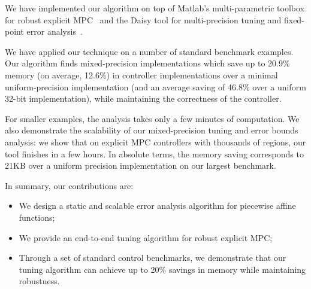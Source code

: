 We have implemented our algorithm on top of Matlab's multi-parametric toolbox 
for robust explicit MPC~\cite{matlabMPT}
and the Daisy tool for multi-precision tuning and fixed-point error analysis~\cite{Daisy}.

We have applied our technique on a number of standard benchmark examples.
Our algorithm finds mixed-precision implementations which save up to 20.9\%
memory (on average, 12.6\%) in controller implementations over a minimal
uniform-precision implementation (and an average saving of 46.8\% over a uniform
32-bit implementation), while maintaining the correctness of the controller.

For smaller examples, the analysis takes only a few minutes of computation.
We also demonstrate the scalability of our mixed-precision tuning and error bounds analysis:
we show that on explicit MPC controllers with thousands of regions, our tool finishes in a few hours.
In absolute terms, the memory saving corresponds to 21KB over a uniform
precision implementation on our largest benchmark.

In summary, our contributions are:
\begin{itemize}
\item We design a static and scalable error analysis algorithm for piecewise affine functions;
\item We provide an end-to-end tuning algorithm for robust explicit MPC;
\item Through a set of standard control benchmarks, we demonstrate that our tuning algorithm
can achieve up to 20\% savings in memory while maintaining robustness.
\end{itemize} 


